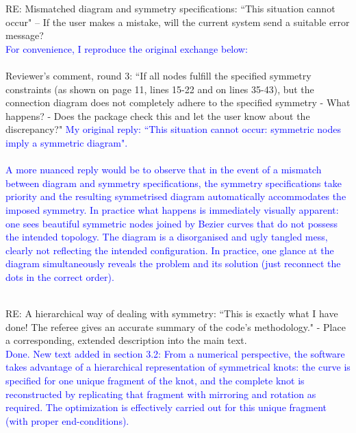 \documentclass[12pt]{article}
\begin{document}
RE: Mismatched diagram and symmetry specifications: ``This situation
cannot occur" -- If the user makes a mistake, will the current system
send a suitable error message?\textcolor{blue}{\\For convenience, I
  reproduce the original exchange below:\\ \\} {\tiny Reviewer's
  comment, round 3: ``If all nodes fulfill the specified symmetry
  constraints (as shown on page 11, lines 15-22 and on lines 35-43),
  but the connection diagram does not completely adhere to the
  specified symmetry - What happens? - Does the package check this and
  let the user know about the discrepancy?"}  \textcolor{blue}{\tiny
  My original reply: ``This situation cannot occur: symmetric nodes
  imply a symmetric diagram".\\ \\} \textcolor{blue}{A more nuanced
  reply would be to observe that in the event of a mismatch between
  diagram and symmetry specifications, the symmetry specifications
  take priority and the resulting symmetrised diagram automatically
  accommodates the imposed symmetry.  In practice what happens is
  immediately visually apparent: one sees beautiful symmetric nodes
  joined by Bezier curves that do not possess the intended topology.
  The diagram is a disorganised and ugly tangled mess, clearly not
  reflecting the intended configuration.  In practice, one glance at
  the diagram simultaneously reveals the problem and its solution
  (just reconnect the dots in the correct order).\\ \\}

RE: A hierarchical way of dealing with symmetry: ``This is exactly
what I have done!  The referee gives an accurate summary of the code's
methodology." - Place a corresponding, extended description into the
main text.\textcolor{blue}{\\Done.  New text added in section 3.2:
  From a numerical perspective, the software takes advantage of a
  hierarchical representation of symmetrical knots: the curve is
  specified for one unique fragment of the knot, and the complete knot
  is reconstructed by replicating that fragment with mirroring and
  rotation as required.  The optimization is effectively carried out
  for this unique fragment (with proper end-conditions).\\ \\}
\end{document}
